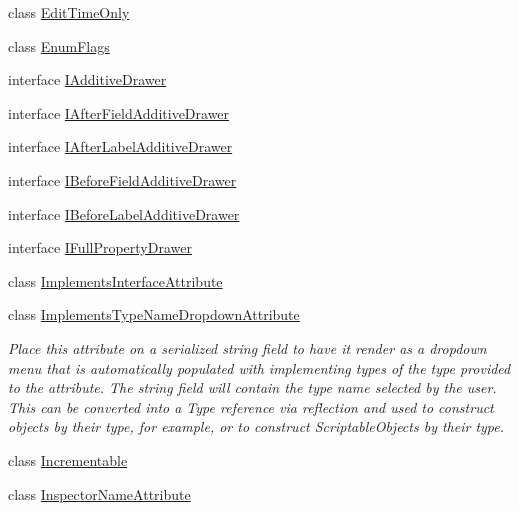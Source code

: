 \begin{DoxyCompactItemize}
class \mbox{\hyperlink{class_leap_1_1_unity_1_1_attributes_1_1_edit_time_only}{Edit\+Time\+Only}}
\item 
class \mbox{\hyperlink{class_leap_1_1_unity_1_1_attributes_1_1_enum_flags}{Enum\+Flags}}
\item 
interface \mbox{\hyperlink{interface_leap_1_1_unity_1_1_attributes_1_1_i_additive_drawer}{I\+Additive\+Drawer}}
\item 
interface \mbox{\hyperlink{interface_leap_1_1_unity_1_1_attributes_1_1_i_after_field_additive_drawer}{I\+After\+Field\+Additive\+Drawer}}
\item 
interface \mbox{\hyperlink{interface_leap_1_1_unity_1_1_attributes_1_1_i_after_label_additive_drawer}{I\+After\+Label\+Additive\+Drawer}}
\item 
interface \mbox{\hyperlink{interface_leap_1_1_unity_1_1_attributes_1_1_i_before_field_additive_drawer}{I\+Before\+Field\+Additive\+Drawer}}
\item 
interface \mbox{\hyperlink{interface_leap_1_1_unity_1_1_attributes_1_1_i_before_label_additive_drawer}{I\+Before\+Label\+Additive\+Drawer}}
\item 
interface \mbox{\hyperlink{interface_leap_1_1_unity_1_1_attributes_1_1_i_full_property_drawer}{I\+Full\+Property\+Drawer}}
\item 
class \mbox{\hyperlink{class_leap_1_1_unity_1_1_attributes_1_1_implements_interface_attribute}{Implements\+Interface\+Attribute}}
\item 
class \mbox{\hyperlink{class_leap_1_1_unity_1_1_attributes_1_1_implements_type_name_dropdown_attribute}{Implements\+Type\+Name\+Dropdown\+Attribute}}
\begin{DoxyCompactList}\small\item\em Place this attribute on a serialized string field to have it render as a dropdown menu that is automatically populated with implementing types of the type provided to the attribute. The string field will contain the type name selected by the user. This can be converted into a Type reference via reflection and used to construct objects by their type, for example, or to construct Scriptable\+Objects by their type. \end{DoxyCompactList}\item 
class \mbox{\hyperlink{class_leap_1_1_unity_1_1_attributes_1_1_incrementable}{Incrementable}}
\item 
class \mbox{\hyperlink{class_leap_1_1_unity_1_1_attributes_1_1_inspector_name_attribute}{Inspector\+Name\+Attribute}}
\item 

\end{DoxyCompactItemize}
